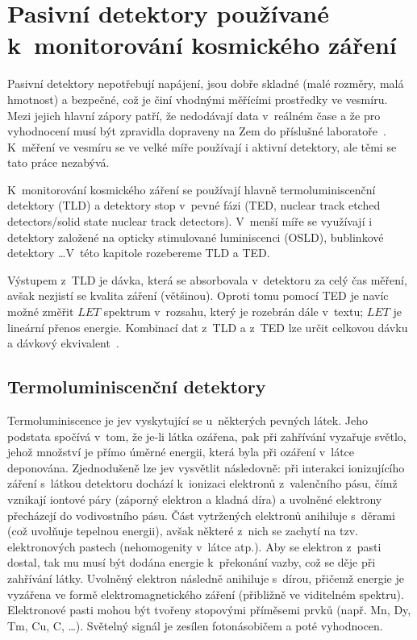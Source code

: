 \chapter{Pasivní detektory používané k~monitorování kosmického záření}\label{sec:detektory_detektory}
Pasivní detektory nepotřebují napájení, jsou dobře skladné (malé rozměry, malá hmotnost) a bezpečné, což je činí vhodnými měřícími prostředky ve vesmíru. Mezi jejich hlavní zápory patří, že nedodávají data v~reálném čase a že pro vyhodnocení musí být zpravidla dopraveny na Zem do příslušné laboratoře~\cite{benton}. K~měření ve vesmíru se ve velké míře používají i aktivní detektory, ale těmi se tato práce nezabývá. 

K~monitorování kosmického záření se používají hlavně termoluminiscenční detektory (TLD) a detektory stop v~pevné fázi (TED, nuclear track etched detectors/solid state nuclear track detectors). V~menší míře se využívají i detektory založené na opticky stimulované luminiscenci (OSLD), bublinkové detektory \ldots V~této kapitole rozebereme TLD a TED.

Výstupem z~TLD je dávka, která se absorbovala v~detektoru za celý čas měření, avšak nezjistí se kvalita záření (většinou). Oproti tomu pomocí TED je navíc možné změřit $\mathit{LET}$ spektrum v~rozsahu, který je rozebrán dále v~textu; $\mathit{LET}$ je lineární přenos energie. Kombinací dat z~TLD a z~TED lze určit celkovou dávku a dávkový ekvivalent~\cite{benton}.
\section{Termoluminiscenční detektory}\label{sec:detektory_TLD}
Termoluminiscence je jev vyskytující se u~některých pevných látek. Jeho podstata spočívá v~tom, že je-li látka ozářena, pak při zahřívání vyzařuje světlo, jehož množství je přímo úměrné energii, která byla při ozáření v~látce deponována. Zjednodušeně lze jev vysvětlit následovně: při interakci ionizujícího záření s~látkou detektoru dochází k~ionizaci elektronů z~valenčního pásu, čímž vznikají iontové páry (záporný elektron a kladná díra) a uvolněné elektrony přecházejí do vodivostního pásu. Část vytržených elektronů anihiluje s~děrami (což uvolňuje tepelnou energii), avšak některé z~nich se zachytí na tzv. elektronových pastech (nehomogenity v~látce atp.). Aby se elektron z~pasti dostal, tak mu musí být dodána energie k~překonání vazby, což se děje při zahřívání látky. Uvolněný elektron následně
anihiluje s~dírou, přičemž energie je vyzářena ve formě elektromagnetického záření (přibližně ve viditelném spektru). Elektronové pasti mohou být tvořeny stopovými příměsemi prvků (např. Mn, Dy, Tm, Cu, C, \ldots). Světelný signál je zesílen fotonásobičem a poté vyhodnocen. 

